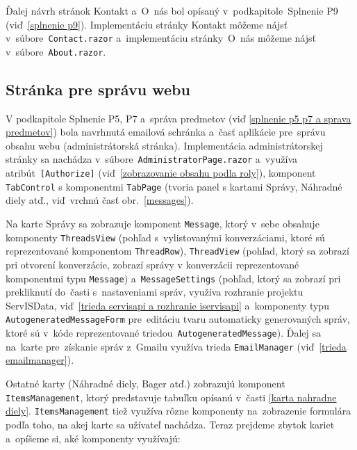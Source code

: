 Ďalej návrh stránok Kontakt a~O~nás bol opísaný v~podkapitole~Splnenie P9 (viď~\ref{splnenie p9}). Implementáciu stránky Kontakt môžeme nájsť v~súbore~\verb|Contact.razor| a~implementáciu stránky~O~nás môžeme nájsť v~súbore~\verb|About.razor|.

\subsection{Stránka pre správu webu}

V podkapitole Splnenie P5, P7 a~správa predmetov (viď \ref{splnenie p5 p7 a sprava predmetov}) bola navrhnutá emailová schránka a~časť aplikácie pre~správu obsahu webu (administrátorská stránka). Implementácia administrátorskej stránky sa nachádza v~súbore~\verb|AdministratorPage.razor| a~využíva atribút~\verb|[Authorize]| (viď~\ref{zobrazovanie obsahu podla roly}), komponent \verb|TabControl| s komponentmi \verb|TabPage| (tvoria panel s kartami Správy, Náhradné diely atď., viď~vrchnú časť obr.~\ref{messages}). 

Na karte Správy sa zobrazuje komponent \verb|Message|, ktorý v~sebe obsahuje komponenty \verb|ThreadsView| (pohľad s~vylistovanými konverzáciami, ktoré sú reprezentované komponentom \verb|ThreadRow|), \verb|ThreadView| (pohľad, ktorý sa zobrazí pri otvorení konverzácie, zobrazí správy v konverzácii reprezentované komponentmi typu \verb|Message|) a~\verb|MessageSettings| (pohľad, ktorý sa zobrazí pri prekliknutí do~časti s~nastaveniami správ, využíva rozhranie projektu ServISData, viď~\ref{trieda servisapi a rozhranie iservisapi} a~komponenty typu \verb|AutogeneratedMessageForm| pre~editáciu tvaru automaticky generovaných správ, ktoré sú v~kóde reprezentované triedou~\verb|AutogeneratedMessage|). Ďalej sa na~karte pre~získanie správ z~Gmailu využíva trieda \verb|EmailManager| (viď~\ref{trieda emailmanager}).

Ostatné karty (Náhradné diely, Bager atď.) zobrazujú komponent \verb|ItemsManagement|, ktorý predstavuje tabuľku opísanú v~časti \ref{karta nahradne diely}. \linebreak\verb|ItemsManagement| tiež využíva rôzne komponenty na~zobrazenie formulára podľa toho, na akej karte sa užívateľ nachádza. Teraz prejdeme zbytok kariet a~opíšeme si, aké komponenty využívajú:

